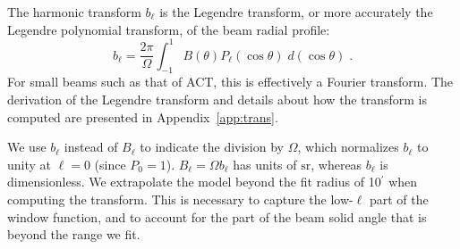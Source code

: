 The harmonic transform $b_{\ell}$ is the Legendre transform, or more accurately the Legendre polynomial transform, of the beam radial profile:
\begin{equation}
b_{\ell} = \frac{2\pi}{\Omega}\int_{-1}^{1} B(\theta)P_{\ell}(\cos\theta)\; d(\cos\theta) \; .
\label{eq:legendre}
\end{equation}
For small beams such as that of ACT, this is effectively a Fourier transform. The derivation of the Legendre transform and details about how the transform is computed are presented in Appendix~\ref{app:trans}.

We use $b_{\ell}$ instead of $B_{\ell}$ to indicate the division by $\Omega$, which normalizes $b_{\ell}$ to unity at $\ell = 0$ (since $P_0 = 1$). $B_{\ell} = \Omega b_{\ell}$ has units of $\mathrm{sr}$, whereas $b_{\ell}$ is dimensionless. We extrapolate the model beyond the fit radius of 10$^{\prime}$ when computing the transform.
This is necessary to capture the low-$\ell$ part of the window function, and to account for the part of the beam solid angle that is beyond the range we fit.





